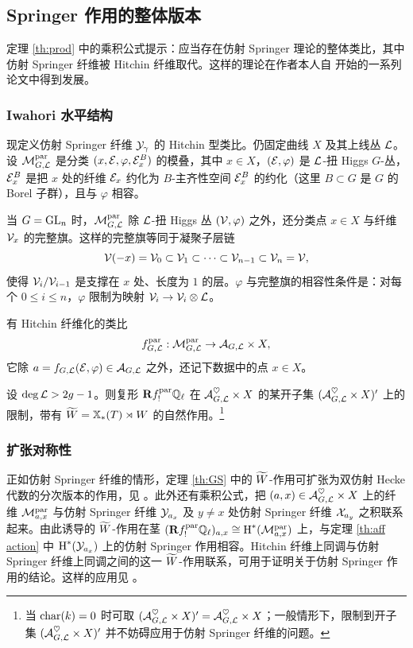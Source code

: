 \subsection{Springer 作用的整体版本}

定理 \ref{th:prod} 中的乘积公式提示：应当存在仿射 Springer 理论的整体类比，其中仿射 Springer 纤维被 Hitchin 纤维取代。这样的理论在作者本人自 \cite{GS} 开始的一系列论文中得到发展。

\subsubsection{Iwahori 水平结构} 现定义仿射 Springer 纤维 $\mathcal{Y}_{\gamma}$ 的 Hitchin 型类比。仍固定曲线 $X$ 及其上线丛 $\mathcal{L}$。设 $\mathcal{M}^{\textup{par}}_{G,\mathcal{L}}$ 是分类 $(x,\mathcal{E},\varphi, \mathcal{E}^{B}_{x})$ 的模叠，其中 $x\in X$，$(\mathcal{E},\varphi)$ 是 $\mathcal{L}$-扭 Higgs $G$-丛，$\mathcal{E}^{B}_{x}$ 是把 $x$ 处的纤维 $\mathcal{E}_{x}$ 约化为 $B$-主齐性空间 $\mathcal{E}^{B}_{x}$ 的约化（这里 $B\subset G$ 是 $G$ 的 Borel 子群），且与 $\varphi$ 相容。

当 $G=\textup{GL}_{n}$ 时，$\mathcal{M}^{\textup{par}}_{G,\mathcal{L}}$ 除 $\mathcal{L}$-扭 Higgs 丛 $(\mathcal{V},\varphi)$ 之外，还分类点 $x\in X$ 与纤维 $\mathcal{V}_{x}$ 的完整旗。这样的完整旗等同于凝聚子层链
\begin{equation*}
\mathcal{V}(-x)=\mathcal{V}_{0}\subset \mathcal{V}_{1}\subset\cdots\subset\mathcal{V}_{n-1}\subset\mathcal{V}_{n}=\mathcal{V},
\end{equation*}
使得 $\mathcal{V}_{i}/\mathcal{V}_{i-1}$ 是支撑在 $x$ 处、长度为 $1$ 的层。$\varphi$ 与完整旗的相容性条件是：对每个 $0\leq i\leq n$，$\varphi$ 限制为映射 $\mathcal{V}_{i}\to\mathcal{V}_{i}\otimes\mathcal{L}$。

有 Hitchin 纤维化的类比
\begin{equation*}
f^{\textup{par}}_{G,\mathcal{L}}:\mathcal{M}^{\textup{par}}_{G,\mathcal{L}}\to \mathcal{A}_{G,\mathcal{L}}\times X,
\end{equation*}
它除 $a=f_{G,\mathcal{L}}(\mathcal{E},\varphi)\in\mathcal{A}_{G,\mathcal{L}}$ 之外，还记下数据中的点 $x\in X$。

\begin{theorem}[见 {\cite[定理 3.3.3]{GS}}]\label{th:GS} 设 $\deg\mathcal{L}>2g-1$。则复形 $\mathbf{R}f^{\textup{par}}_{!}\mathbb{Q}_{\ell}$ 在 $\mathcal{A}^{\heartsuit}_{G,\mathcal{L}}\times X$ 的某开子集 $(\mathcal{A}^{\heartsuit}_{G,\mathcal{L}}\times X)'$ 上的限制，带有 $\widetilde{W}=\mathbb{X}_*(T)\rtimes W$ 的自然作用。\footnote{当 $\textup{char}(k)=0$ 时可取 $(\mathcal{A}^{\heartsuit}_{G,\mathcal{L}}\times X)'=\mathcal{A}^{\heartsuit}_{G,\mathcal{L}}\times X$；一般情形下，限制到开子集 $(\mathcal{A}^{\heartsuit}_{G,\mathcal{L}}\times X)'$ 并不妨碍应用于仿射 Springer 纤维的问题。}
\end{theorem}

\subsubsection{扩张对称性} 正如仿射 Springer 纤维的情形，定理 \ref{th:GS} 中的 $\widetilde{W}$-作用可扩张为双仿射 Hecke 代数的分次版本的作用，见 \cite[定理 6.1.6]{GS}。此外还有乘积公式，把 $(a,x)\in\mathcal{A}^{\heartsuit}_{G,\mathcal{L}}\times X$ 上的纤维 $\mathcal{M}^{\textup{par}}_{a,x}$ 与仿射 Springer 纤维 $\mathcal{Y}_{a_{x}}$ 及 $y\neq x$ 处仿射 Springer 纤维 $\mathcal{X}_{a_{y}}$ 之积联系起来。由此诱导的 $\widetilde{W}$-作用在茎 $(\mathbf{R}f^{\textup{par}}_{!}\mathbb{Q}_{\ell})_{a,x}\cong\textup{H}^{*}({\mathcal{M}^{\textup{par}}_{a,x}})$ 上，与定理 \ref{th:aff action} 中 $\textup{H}^{*}({\mathcal{Y}_{a_{x}}})$ 上的仿射 Springer 作用相容。Hitchin 纤维上同调与仿射 Springer 纤维上同调之间的这一 $\widetilde{W}$-作用联系，可用于证明关于仿射 Springer 作用的结论。这样的应用见 \cite{YSph}。

